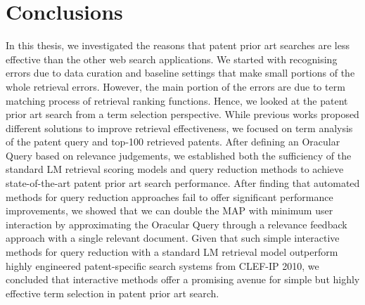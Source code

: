 \chapter{Conclusions}
\label{cha:conc}


In this thesis, we investigated the reasons that patent prior art searches 
are less effective than the other web search applications.
We started with recognising errors due to data curation and baseline settings that 
make small portions of the whole retrieval errors. However, the main portion of the errors are 
due to term matching process of retrieval ranking functions. 
Hence, we looked at the patent prior art search from
a term selection perspective. While previous works proposed
different solutions to improve retrieval effectiveness, we 
focused on term analysis of the patent query and top-100 retrieved patents. 
After defining an Oracular Query based on
relevance judgements, we established both the sufficiency
of the standard LM retrieval scoring models and query reduction 
methods to achieve state-of-the-art patent prior art
search performance. After finding that automated methods 
for query reduction approaches fail to offer significant
performance improvements, we showed that we can double
the MAP with minimum user interaction by approximating
the Oracular Query through a relevance feedback approach
with a single relevant document. Given that such simple 
interactive methods for query reduction with a standard LM
retrieval model outperform highly engineered patent-specific
search systems from CLEF-IP 2010, we concluded that interactive 
methods offer a promising avenue for simple but
highly effective term selection in patent prior art search.
 

